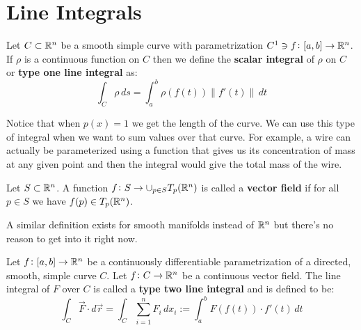 \documentclass[11pt,a4paper]{article}
\begin{document}

\newpage

\section{Line Integrals}

\begin{definition}
  Let $C \subset \mathbb{R}^n$ be a smooth simple curve with 
  parametrization $C^1 \ni f \colon [a,b] \to \mathbb{R}^n$. If $\rho$ is
  a continuous function on $C$ then we define the 
  \textbf{scalar integral} of $\rho$ on $C$ or \textbf{type one
  line integral} as:
  \[
    \int_{C}{\rho \,ds} = \int_{a}^{b}{\rho(f(t))\|f'(t)\|\,dt}
  \]
\end{definition}
Notice that when $p(x) = 1$ we get the length of the curve. We can
use this type of integral when we want to sum values over that
curve. For example, a wire can actually be parameterized using
a function that gives us its concentration of mass at any given
point and then the integral would give the total mass of the wire.
\begin{definition}
  Let $S \subset \mathbb{R}^n$. A function 
  $f \colon S \to \cup_{p \in S}{T_p(\mathbb{R}^n)}$ is called a
  \textbf{vector field} if for all $p \in S$ we have
  $f(p) \in T_p(\mathbb{R}^n)$.
\end{definition}
A similar definition exists for smooth manifolds instead of $\mathbb{R}^n$ 
but there's no reason to get into it right now.
\begin{definition}
  Let $f \colon [a,b] \to \mathbb{R}^n$ be a continuously differentiable
  parametrization of a directed, smooth, simple curve $C$.
  Let $f \colon C \to \mathbb{R}^n$ be a continuous vector field. The
  line integral of $F$ over $C$ is called a \textbf{type two
  line integral} and is defined to be:
  \[
    \int_{C}{\vec{F} \cdot d\vec{r}} = 
    \int_{C}{\sum_{i=1}^{n}{F_i}\,dx_i} :=
    \int_{a}^{b}{F(f(t)) \cdot f'(t) \,dt}
  \]
\end{definition}

\newpage
\end{document}
